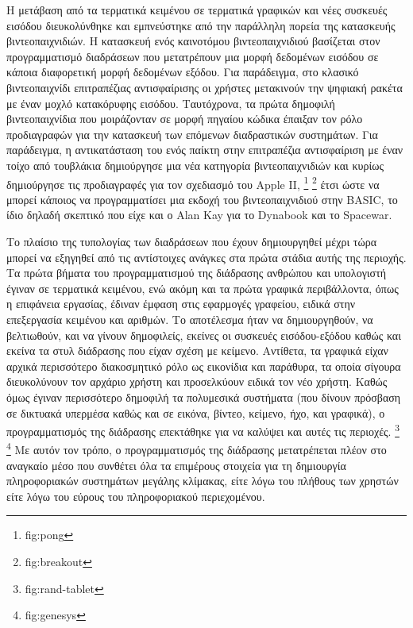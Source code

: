 \documentclass[
]{article}
\begin{document}
Η μετάβαση από τα τερματικά κειμένου σε τερματικά γραφικών και νέες
συσκευές εισόδου διευκολύνθηκε και εμπνεύστηκε από την παράλληλη πορεία
της κατασκευής βιντεοπαιχνιδιών. Η κατασκευή ενός καινοτόμου
βιντεοπαιχνιδιού βασίζεται στον προγραμματισμό διαδράσεων που
μετατρέπουν μια μορφή δεδομένων εισόδου σε κάποια διαφορετική μορφή
δεδομένων εξόδου. Για παράδειγμα, στο κλασικό βιντεοπαιχνίδι
επιτραπέζιας αντισφαίρισης οι χρήστες μετακινούν την ψηφιακή ρακέτα με
έναν μοχλό κατακόρυφης εισόδου. Ταυτόχρονα, τα πρώτα δημοφιλή
βιντεοπαιχνίδια που μοιράζονταν σε μορφή πηγαίου κώδικα έπαιξαν τον ρόλο
προδιαγραφών για την κατασκευή των επόμενων διαδραστικών συστημάτων. Για
παράδειγμα, η αντικατάσταση του ενός παίκτη στην επιτραπέζια
αντισφαίριση με έναν τοίχο από τουβλάκια δημιούργησε μια νέα κατηγορία
βιντεοπαιχνιδιών και κυρίως δημιούργησε τις προδιαγραφές για τον
σχεδιασμό του Apple II, \footnote{fig:pong} \footnote{fig:breakout} έτσι
ώστε να μπορεί κάποιος να προγραμματίσει μια εκδοχή του βιντεοπαιχνιδιού
στην BASIC, το ίδιο δηλαδή σκεπτικό που είχε και ο Alan Kay για το
Dynabook και το Spacewar.

Το πλαίσιο της τυπολογίας των διαδράσεων που έχουν δημιουργηθεί μέχρι
τώρα μπορεί να εξηγηθεί από τις αντίστοιχες ανάγκες στα πρώτα στάδια
αυτής της περιοχής. Τα πρώτα βήματα του προγραμματισμού της διάδρασης
ανθρώπου και υπολογιστή έγιναν σε τερματικά κειμένου, ενώ ακόμη και τα
πρώτα γραφικά περιβάλλοντα, όπως η επιφάνεια εργασίας, έδιναν έμφαση
στις εφαρμογές γραφείου, ειδικά στην επεξεργασία κειμένου και αριθμών.
Το αποτέλεσμα ήταν να δημιουργηθούν, να βελτιωθούν, και να γίνουν
δημοφιλείς, εκείνες οι συσκευές εισόδου-εξόδου καθώς και εκείνα τα στυλ
διάδρασης που είχαν σχέση με κείμενο. Αντίθετα, τα γραφικά είχαν αρχικά
περισσότερο διακοσμητικό ρόλο ως εικονίδια και παράθυρα, τα οποία
σίγουρα διευκολύνουν τον αρχάριο χρήστη και προσελκύουν ειδικά τον νέο
χρήστη. Καθώς όμως έγιναν περισσότερο δημοφιλή τα πολυμεσικά συστήματα
(που δίνουν πρόσβαση σε δικτυακά υπερμέσα καθώς και σε εικόνα, βίντεο,
κείμενο, ήχο, και γραφικά), ο προγραμματισμός της διάδρασης επεκτάθηκε
για να καλύψει και αυτές τις περιοχές. \footnote{fig:rand-tablet}
\footnote{fig:genesys} Με αυτόν τον τρόπο, ο προγραμματισμός της
διάδρασης μετατρέπεται πλέον στο αναγκαίο μέσο που συνθέτει όλα τα
επιμέρους στοιχεία για τη δημιουργία πληροφοριακών συστημάτων μεγάλης
κλίμακας, είτε λόγω του πλήθους των χρηστών είτε λόγω του εύρους του
πληροφοριακού περιεχομένου.
\end{document}
